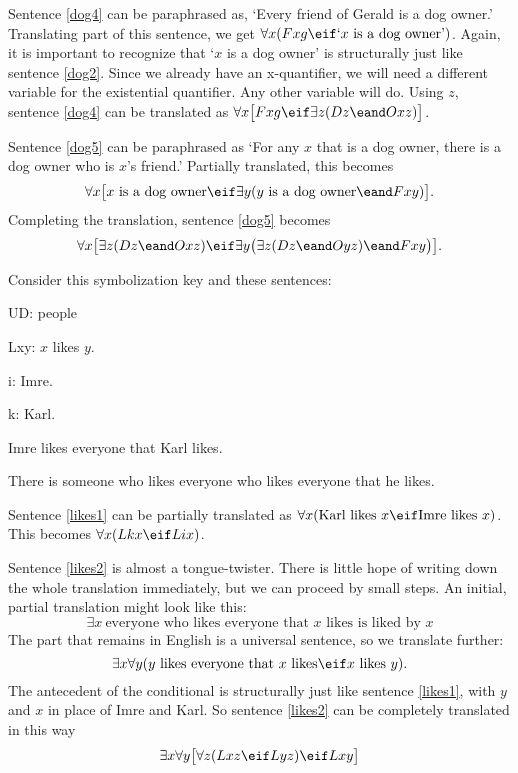 Sentence \ref{dog4} can be paraphrased as, `Every friend of Gerald is a dog owner.' Translating part of this sentence, we get $\forall x(Fxg \eif\mbox{`$x$ is a dog owner'})$. Again, it is important to recognize that `$x$ is a dog owner' is structurally just like sentence \ref{dog2}. Since we already have an x-quantifier, we will need a different variable for the existential quantifier. Any other variable will do. Using $z$, sentence \ref{dog4} can be translated as $\forall x\bigl[Fxg \eif\exists z(Dz \eand Oxz)\bigr]$.

Sentence \ref{dog5} can be paraphrased as `For any $x$ that is a dog owner, there is a dog owner who is $x$'s friend.' Partially translated, this becomes $$\forall x\bigl[\mbox{$x$ is a dog owner}\eif\exists y(\mbox{$y$ is a dog owner}\eand Fxy)\bigr].$$ Completing the translation, sentence \ref{dog5} becomes $$\forall x\bigl[\exists z(Dz \eand Oxz)\eif\exists y\bigl(\exists z(Dz \eand Oyz)\eand Fxy\bigr)\bigr].$$

Consider this symbolization key and these sentences:
\begin{ekey}
\item[UD:] people
\item[Lxy:] $x$ likes $y$.
\item[i:] Imre.
\item[k:] Karl.
\end{ekey}
\begin{earg}
\item[\ex{likes1}]Imre likes everyone that Karl likes.
\item[\ex{likes2}]There is someone who likes everyone who likes everyone that he likes.
\end{earg}



Sentence \ref{likes1} can be partially translated as $\forall x(\mbox{Karl likes $x$}\eif\mbox{Imre likes $x$})$. This becomes $\forall x(Lkx\eif Lix)$.


Sentence \ref{likes2} is almost a tongue-twister. There is little hope of writing down the whole translation immediately, but we can proceed by small steps. An initial, partial translation might look like this: $$\exists x\ \mbox{everyone who likes everyone that $x$ likes is liked by $x$}$$
The part that remains in English is a universal sentence, so we translate further: $$\exists x\forall y(\mbox{$y$ likes everyone that $x$ likes}\eif\mbox{$x$ likes $y$}).$$
The antecedent of the conditional is structurally just like sentence \ref{likes1}, with $y$ and $x$ in place of Imre and Karl. So sentence \ref{likes2} can be completely translated in this way $$\exists x\forall y\bigl[\forall z(Lxz \eif Lyz) \eif Lxy\bigr]$$

